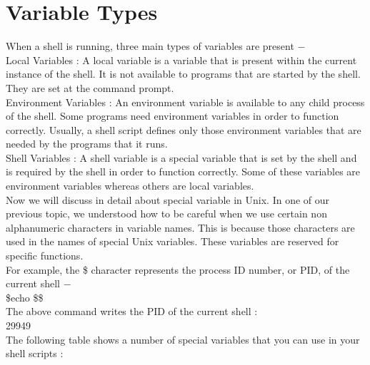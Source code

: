 \documentclass{article}
\begin{document}
\section*{Variable Types}
When a shell is running, three main types of variables are present −\\
    Local Variables : A local variable is a variable that is present within the current instance of the shell. It is not available to programs that are started by the shell. They are set at the command prompt.\\
    Environment Variables : An environment variable is available to any child process of the shell. Some programs need environment variables in order to function correctly. Usually, a shell script defines only those environment variables that are needed by the programs that it runs.\\
    Shell Variables : A shell variable is a special variable that is set by the shell and is required by the shell in order to function correctly. Some of these variables are environment variables whereas others are local variables.\\
Now we will discuss in detail about special variable in Unix. In one of our previous topic, we understood how to be careful when we use certain non alphanumeric characters in variable names. This is because those characters are used in the names of special Unix variables. These variables are reserved for specific functions.\\
For example, the \$ character represents the process ID number, or PID, of the current shell −\\
\$echo \$\$\\
The above command writes the PID of the current shell :\\
29949\\
The following table shows a number of special variables that you can use in your shell scripts :\\
\noindent
\end{document}
